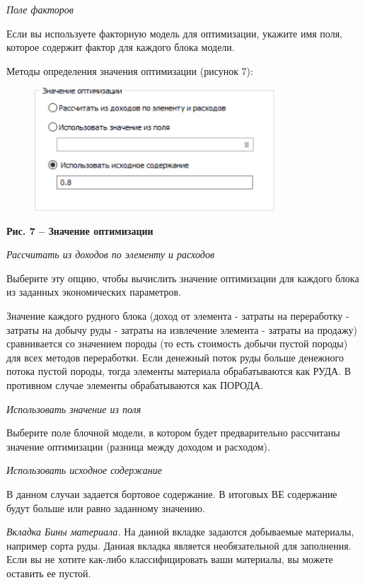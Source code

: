 \emph{Поле факторов}

Если вы используете факторную модель для оптимизации, укажите имя поля,
которое содержит фактор для каждого блока модели.

Методы определения значения оптимизации (рисунок 7):

\begin{figure}[H]
	\centering
	\includegraphics[width=0.8\textwidth]{assets/1256}
	\caption*{}
\end{figure}

{\bfseries Рис. 7 -- Значение оптимизации}

\emph{Рассчитать из доходов по элементу и расходов}

Выберите эту опцию, чтобы вычислить значение оптимизации для каждого
блока из заданных экономических параметров.

Значение каждого рудного блока (доход от элемента - затраты на
переработку - затраты на добычу руды - затраты на извлечение элемента -
затраты на продажу) сравнивается со значением породы (то есть стоимость
добычи пустой породы) для всех методов переработки. Если денежный поток
руды больше денежного потока пустой породы, тогда элементы материала
обрабатываются как РУДА. В противном случае элементы обрабатываются как
ПОРОДА.

\emph{Использовать значение из поля}

Выберите поле блочной модели, в котором будет предварительно рассчитаны
значение оптимизации (разница между доходом и расходом).

\emph{Использовать исходное содержание}

В данном случаи задается бортовое содержание. В итоговых ВЕ содержание
будут больше или равно заданному значению.

\emph{Вкладка Бины материала.} На данной вкладке задаются добываемые
материалы, например сорта руды. Данная вкладка является необязательной
для заполнения. Если вы не хотите как-либо классифицировать ваши
материалы, вы можете оставить ее пустой.

